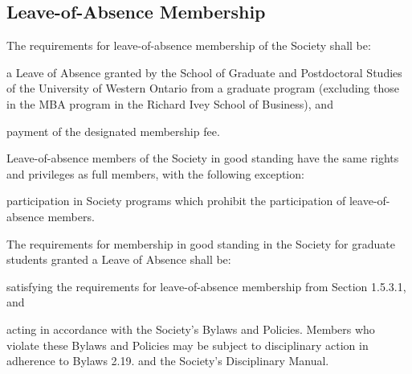 \subsection{Leave-of-Absence Membership}
	\begin{longenum}[label*=\thesubsection.\arabic*., align=left]
	\item The requirements for leave-of-absence membership of the Society shall be:
	\begin{longenum}[label*=\arabic*., align=left]
		\item a Leave of Absence granted by the School of Graduate and Postdoctoral Studies of the University of Western Ontario from a graduate program (excluding those in the MBA program in the Richard Ivey School of Business), and
		\item payment of the designated membership fee.
	\end{longenum}
	\item Leave-of-absence members of the Society in good standing have the same rights and privileges as full members, with the following exception:
	\begin{longenum}[label*=\arabic*., align=left]
		\item participation in Society programs which prohibit the participation of leave-of-absence members.
	\end{longenum}
	\item The requirements for membership in good standing in the Society for graduate students granted a Leave of Absence shall be:
	\begin{longenum}[label*=\arabic*., align=left]
		\item satisfying the requirements for leave-of-absence membership from Section 1.5.3.1, and
		\item acting in accordance with the Society’s Bylaws and Policies. Members who violate these Bylaws and Policies may be subject to disciplinary action in adherence to Bylaws 2.19. and the Society’s Disciplinary Manual.
	\end{longenum}
\end{longenum}

